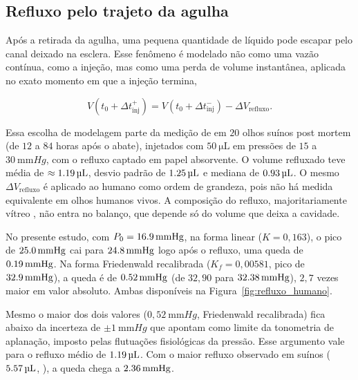 \subsection{Refluxo pelo trajeto da agulha}
 
Após a retirada da agulha, uma pequena quantidade de líquido pode escapar pelo canal deixado na esclera. Esse fenômeno é modelado não como uma vazão contínua, como a injeção, mas como uma perda de volume instantânea, aplicada no exato momento em que a injeção termina,
 
\begin{equation}
V(t_0+\Delta t_{\text{inj}}^+) = V(t_0+\Delta t_{\text{inj}}^-) - \Delta V_{\text{refluxo}}.
\label{eq:refluxo}
\end{equation}
 
Essa escolha de modelagem parte da medição de \citet{brodie2014} em $20$ olhos suínos post mortem (de $12$ a $84$ horas após o abate), injetados com $\SI{50}{\micro\liter}$ em pressões de $15$ a $\SI{30}{\milli\meter Hg}$, com o refluxo captado em papel absorvente. O volume refluxado teve média de $\approx\SI{1{,}19}{\micro\liter}$, desvio padrão de $\SI{1{,}25}{\micro\liter}$ e mediana de $\SI{0{,}93}{\micro\liter}$. O mesmo $\Delta V_{\text{refluxo}}$ é aplicado ao humano como ordem de grandeza, pois não há medida equivalente em olhos humanos vivos. A composição do refluxo, majoritariamente vítreo \citep{brodie2014}, não entra no balanço, que depende só do volume que deixa a cavidade.
 
No presente estudo, com $P_0=\SI{16{,}9}{\milli\meter Hg}$, na forma linear ($K=0{,}163$), o pico de $\SI{25{,}0}{\milli\meter Hg}$ cai para $\SI{24{,}8}{\milli\meter Hg}$ logo após o refluxo, uma queda de $\SI{0{,}19}{\milli\meter Hg}$. Na forma Friedenwald recalibrada ($K_f=0{,}00581$, pico de $\SI{32{,}9}{\milli\meter Hg}$), a queda é de $\SI{0{,}52}{\milli\meter Hg}$ (de $32{,}90$ para $\SI{32{,}38}{\milli\meter Hg}$), $2{,}7$ vezes maior em valor absoluto. Ambas disponíveis na Figura~\ref{fig:refluxo_humano}.

Mesmo o maior dos dois valores ($0{,}52\ \unit{\milli\meter Hg}$, Friedenwald recalibrada) fica abaixo da incerteza de $\pm\SI{1}{\milli\meter Hg}$ que \citet[p.~241]{goldmannschmidt1957} apontam como limite da tonometria de aplanação, imposto pelas flutuações fisiológicas da pressão. Esse argumento vale para o refluxo médio de $\SI{1{,}19}{\micro\liter}$. Com o maior refluxo observado em suínos ($\SI{5{,}57}{\micro\liter}$, \citealp{brodie2014}), a queda chega a $\SI{2{,}36}{\milli\meter Hg}$.

